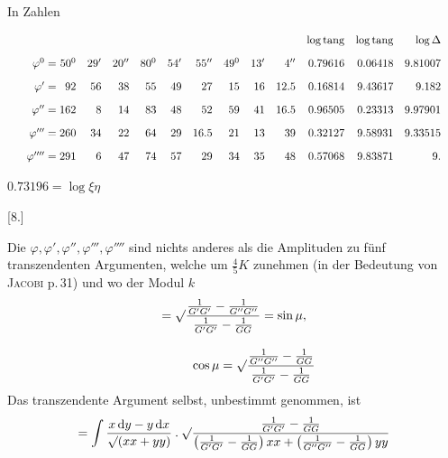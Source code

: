 \begin{landscape}

In Zahlen
\par\nopagebreak%
\begingroup\small\relax\setlength{\arraycolsep}{2pt}\[
\resizebox{.98\linewidth}{!}{$\displaystyle \begin{array}{r@{\;}c@{\;}rrr@{\quad}rrr@{\quad}rrr@{\quad}rrr} &&&&&&&&&&&\log\operatorname{tang}&\log\operatorname{tang}&\log\Delta\\[9pt] \varphi^0&=&50^0&29'&20''&80^0&54'&55''&49^0&13'&4''&0.79616&0.06418&9.81007\\[9pt] \varphi'&=&92&56&38&55&49&27&15&16&12.5&0.16814&9.43617&9.182\\[9pt] \varphi''&=&162&8&14&83&48&52&59&41&16.5&0.96505&0.23313&9.97901\\[9pt] \varphi'''&=&260&34&22&64&29&16.5&21&13&39&0.32127&9.58931&9.33515\\[9pt] \varphi''''&=&291&6&47&74&57&29&34&35&48&0.57068&9.83871&9. \end{array}$}
\]\endgroup\par%

\hfill $0.73196=\log\xi\eta$\hspace*{.12\textwidth}\par


\end{landscape}
\par\medskip{}\centerline{[8.]}\nobreak\smallskip
Die $\varphi,\varphi',\varphi'',\varphi''',\varphi''''$ sind nichts anderes als die Amplituden zu fünf transzendenten Argumenten, welche um $\frac45K$ zunehmen (in der Bedeutung von \textsc{Jacobi}
p.\,31) und wo der Modul $k$
\[
\begin{gathered}=\surd\frac{\frac{1}{G'G'}-\frac{1}{G''G''}}{\frac{1}{G'G'}-\frac{1}{GG}} =\sin\mu,\\[9pt]\quad{}\qquad \cos\mu=\surd\frac{\frac{1}{G''G''}-\frac{1}{GG}}{\frac{1}{G'G'}-\frac{1}{GG}}\end{gathered}
\]
Das transzendente Argument selbst, unbestimmt genommen, ist
\[
=\int\frac{x\,\mathrm{d}y-y\,\mathrm{d}x}{\surd(xx+yy)}\mathbin{.} \surd\frac{\frac{1}{G'G'}-\frac{1}{GG}} {\left(\frac{1}{G'G'}-\frac{1}{GG}\right)xx+\left(\frac{1}{G''G''}-\frac{1}{GG}\right)yy}
\]

